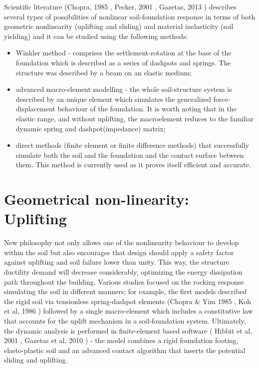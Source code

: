 \documentclass[12pt,a4paper]{report}
\begin{document}
Scientific literature (Chopra, 1985 \cite{chopra1985simplified}, Pecker, 2001 \cite{cremer2001cyclic}, Gazetas, 2013 \cite{gazetas2013can}) describes several types of possibilities of nonlinear soil-foundation response in terms of both geometric nonlinearity (uplifting and sliding) and material inelasticity (soil yielding) and it can be studied using the following methods:
\begin{itemize}
	\item 	Winkler method - comprises the settlement-rotation at the base of the foundation which is described as a series of dashpots and springs. The structure was described by a beam on an elastic medium;
	\item 	advanced macro-element modelling - the whole soil-structure system is described by an unique element which simulates the generalized force-displacement behaviour of the foundation. It is worth noting that in the elastic range, and without uplifting, the macroelement reduces to the familiar dynamic spring and dashpot(impedance) matrix;
	\item direct methods (finite element or finite difference methods) that successfully simulate both the soil and the foundation and the contact surface between them. This method is currently used as it proves itself efficient and accurate.
\end{itemize}

\section{Geometrical non-linearity: Uplifting}
New philosophy not only allows one of the nonlinearity behaviour to develop within the soil but also encourages that design should apply a safety factor against uplifting and soil \mbox{failure} lower than unity. This way, the structure ductility demand will decrease \mbox{considerably}, optimizing the energy dissipation path throughout the building. Various studies focused on the rocking response simulating the soil in different manners; for example, the first models described the rigid soil via tensionless spring-dashpot elements (Chopra \& Yim 1985 \cite{chopra1985simplified}, Koh et al, 1986 \cite{koh1986harmonic}) followed by a single macro-element which includes a constitutive law that accounts for the uplift mechanism in a soil-foundation system. Ultimately, the dynamic analysis is performed in finite-element based software ( Hibbit et al, 2001 \cite{hibbett1998abaqus}, Gazetas et al, 2010 \cite{anastasopoulos2010soil}) - the model combines a rigid foundation footing, elasto-plastic soil and an advanced contact algorithm that inserts the potential sliding and uplifting.
\end{document}
